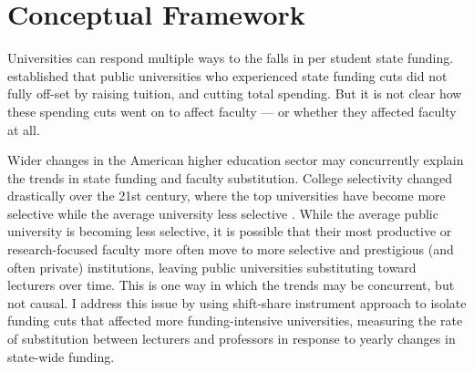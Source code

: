 \section{Conceptual Framework}
\label{sec:conceptual}

Universities can respond multiple ways to the falls in per student state funding.
\cite{NBERw23736} established that public universities who experienced state funding cuts did not fully off-set by raising tuition, and cutting total spending.
But it is not clear how these spending cuts went on to affect faculty --- or whether they affected faculty at all.

Wider changes in the American higher education sector may concurrently explain the trends in state funding and faculty substitution.
College selectivity changed drastically over the 21st century, where the top universities have become more selective while the average university less selective \citep{hoxby2009changing}.
While the average public university is becoming less selective, it is possible that their most productive or research-focused faculty more often move to more selective and prestigious (and often private) institutions, leaving public universities substituting toward lecturers over time.
This is one way in which the trends may be concurrent, but not causal.
I address this issue by using shift-share instrument approach to isolate funding cuts that affected more funding-intensive universities, measuring the rate of substitution between lecturers and professors in response to yearly changes in state-wide funding.

